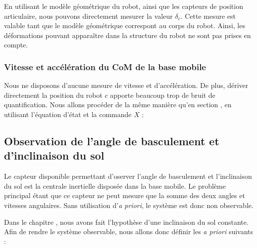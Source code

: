 				En utilisant le modèle géométrique du robot, ainsi que les capteurs de position articulaire, nous pouvons directement mesurer la valeur $\delta_c$.
				Cette mesure est valable tant que le modèle géométrique correspont au corps du robot. Ainsi, les déformations pouvant apparaître dans la structure du robot ne sont pas prises en compte.
		
			\subsubsection{Vitesse et accélération du CoM de la base mobile}
			
				Nous ne disposons d'aucune mesure de vitesse et d'accélération. 
				De plus, dériver directement la position du robot $c$ apporte beaucoup trop de bruit de quantification.
				Nous allons procéder de la même manière qu'en section , en utilisant l'équation d'état  et la commande $X$ :
				
			
		\subsection{Observation de l'angle de basculement et d'inclinaison du sol}
		\label{section.mesure_tilt_pente}
		
			Le capteur disponible permettant d'oserver l'angle de basculement et l'inclinaison du sol est la centrale inertielle disposée dans la base mobile.
			Le problème principal étant que ce capteur ne peut mesure que la somme des deux angles et vitesses angulaires.
			Sans utilisation d'\textit{a priori}, le système est donc non observable.
			
			Dans le chapitre , nous avons fait l'hypothèse d'une inclinaison du sol constante.
			Afin de rendre le système observable, nous allons donc définir les \textit{a priori} suivants :
			
